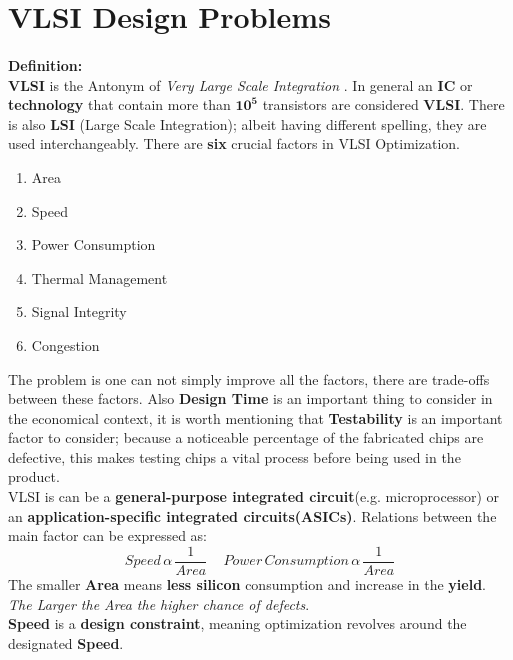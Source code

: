 \section{VLSI Design Problems}
\paragraph{}
\textbf{Definition:}\vspace{1em}\\
{\textbf{VLSI}} is the Antonym of \textit{Very Large Scale Integration} \cite{lsi} . In general an \textbf{IC} or \textbf{technology} that contain more than \(\mathbf{10^{5}}\) transistors are considered \textbf{VLSI}. There is also \textbf{LSI} (Large Scale Integration); albeit having different spelling, they are used interchangeably. There are \textbf{six} crucial factors in VLSI Optimization.\\
\begin{enumerate}
\item Area
\item Speed
\item Power Consumption 
\item Thermal Management
\item Signal Integrity
\item Congestion
\end{enumerate}

The problem is one can not simply improve all the factors, there are trade-offs between these factors. Also \textbf{Design Time} is an important thing to consider in the economical context, it is worth mentioning that\textbf{ Testability} is an important factor to consider; because a noticeable percentage of the fabricated chips are defective, this makes testing chips a vital process before being used in the product. \\ VLSI is can be a\textbf{ general-purpose integrated circuit}(e.g. microprocessor) or an \textbf{application-specific integrated circuits(ASICs)}.
Relations between the main factor can be expressed as:\[
	\mathit{Speed}\,\alpha\,\frac{1}{\mathit{Area}}\quad \,\mathit{Power\,Consumption}\,\alpha\,\frac{1}{\mathit{Area}} 
\]
The smaller \textbf{Area} means \textbf{less silicon }consumption and increase in the\textbf{ yield}. \textit{The Larger the Area the higher chance of defects}.\\
\textbf{Speed} is a\textbf{ design constraint}, meaning optimization revolves around the designated \textbf{Speed}. 